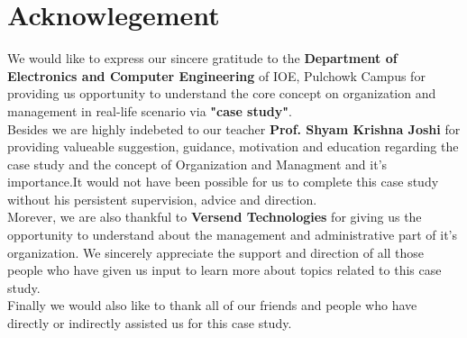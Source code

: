 \section*{Acknowlegement}
We would like to express our sincere gratitude to the \textbf{Department of Electronics and Computer Engineering} of IOE, Pulchowk Campus for providing us opportunity to understand the core concept on organization and management in real-life scenario via \textbf{"case study"}.\\
Besides we are highly indebeted to our teacher \textbf{Prof. Shyam Krishna Joshi} for providing valueable suggestion, guidance, motivation and education regarding the case study and the concept of Organization and Managment and it's importance.It would not have been possible for us to complete this case study without his persistent supervision, advice and direction.\\
Morever, we are also thankful to \textbf{Versend Technologies} for giving us the opportunity to understand about the management and administrative part of it's organization. We sincerely appreciate the support and direction of all those people who have given us input to learn more about topics related to this case study.\\
Finally we would also like to thank all of our friends and people who have directly or indirectly assisted us for this case study.\\
\cleardoublepage
